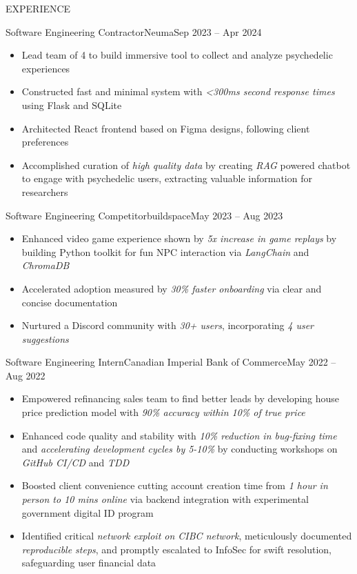 \documentclass[]{mcdowellcv}
\begin{document}
\makeheader


\begin{cvsection}{EXPERIENCE}

	\begin{cvsubsection}{Software Engineering Contractor}{Neuma}{Sep 2023 -- Apr 2024}
		\begin{itemize}%
			\item Lead team of 4 to build immersive tool to collect and analyze psychedelic experiences
			\item Constructed fast and minimal system with \textit{\textless{}300ms second response times} using Flask and SQLite
			\item Architected React frontend based on Figma designs, following client preferences
			\item Accomplished curation of \textit{high quality data} by creating \textit{RAG} powered chatbot to engage with psychedelic users, extracting valuable information for researchers
		\end{itemize}
	\end{cvsubsection}

	\begin{cvsubsection}{Software Engineering Competitor}{buildspace}{May 2023 -- Aug 2023}
		\begin{itemize}%
			\item Enhanced video game experience shown by \textit{5x increase in game replays} by building Python toolkit for fun NPC interaction via \textit{LangChain} and \textit{ChromaDB}
			\item Accelerated adoption measured by \textit{30\% faster onboarding} via clear and concise documentation
			\item Nurtured a Discord community with \textit{30+ users}, incorporating \textit{4 user suggestions}
		\end{itemize}
	\end{cvsubsection}

	\begin{cvsubsection}{Software Engineering Intern}{Canadian Imperial Bank of Commerce}{May 2022 -- Aug 2022}
		\begin{itemize}%
			\item Empowered refinancing sales team to find better leads by developing house price prediction model with \textit{90\% accuracy within 10\% of true price}
			\item Enhanced code quality and stability with \textit{10\% reduction in bug-fixing time} and \textit{accelerating development cycles by 5-10\%} by conducting workshops on \textit{GitHub CI/CD} and \textit{TDD}
			\item Boosted client convenience cutting account creation time from \textit{1 hour in person to 10 mins online} via backend integration with experimental government digital ID program
			\item Identified critical \textit{network exploit on CIBC network}, meticulously documented \textit{reproducible steps}, and promptly escalated to InfoSec for swift resolution, safeguarding user financial data
		\end{itemize}
	\end{cvsubsection}


\end{cvsection}
\end{document}
